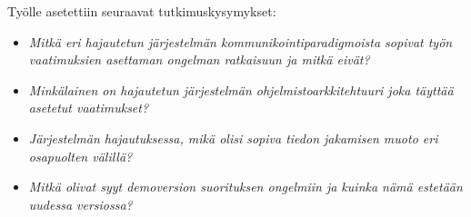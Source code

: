 Työlle asetettiin seuraavat tutkimuskysymykset:
\begin{itemize}
	\item \emph{Mitkä eri hajautetun järjestelmän kommunikointiparadigmoista sopivat työn vaatimuksien asettaman ongelman ratkaisuun ja mitkä eivät?}
	\item \emph{Minkälainen on hajautetun järjestelmän ohjelmistoarkkitehtuuri joka täyttää asetetut vaatimukset?}
	\item \emph{Järjestelmän hajautuksessa, mikä olisi sopiva tiedon jakamisen muoto eri osapuolten välillä?}
	\item \emph{Mitkä olivat syyt demoversion suorituksen ongelmiin ja kuinka nämä estetään uudessa versiossa?}
\end{itemize}